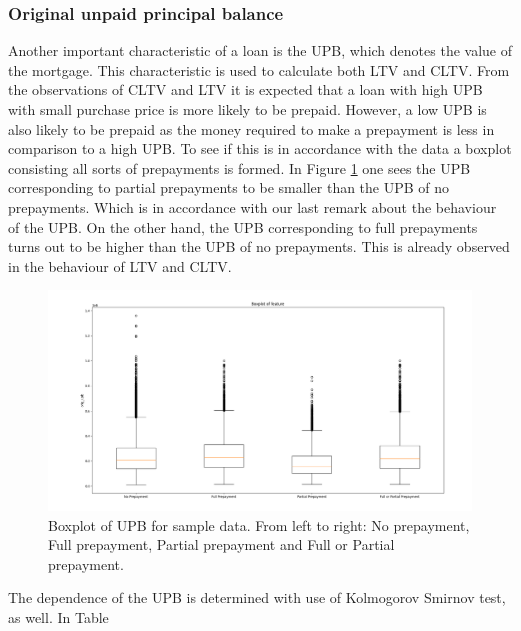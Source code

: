     \subsubsection{Original unpaid principal balance}
        Another important characteristic of a loan is the UPB, 
        which denotes the value of the mortgage. This characteristic 
        is used to calculate both LTV and CLTV. From the 
        observations of CLTV and LTV it is expected that a loan 
        with high UPB with small purchase price is more likely 
        to be prepaid. However, a low UPB is also likely to be 
        prepaid as the money required to make a prepayment is 
        less in comparison to a high UPB. To see if this is in 
        accordance with the data a boxplot consisting all 
        sorts of prepayments is formed. In Figure 
        \ref{model_boxplot_UPB} one sees the UPB corresponding 
        to partial prepayments to be smaller than the UPB of no 
        prepayments. Which is in accordance with our last remark 
        about the behaviour of the UPB. On the other hand, the 
        UPB corresponding to full prepayments turns out to be 
        higher than the UPB of no prepayments. This is already 
        observed in the behaviour of LTV and CLTV. 
        \begin{figure}[H]
            \centering
            \includegraphics[width=\linewidth]{Figures/Boxplot_of_upb_[2013, 2014, 2015, 2016, 2017, 2018, 2019, 2020]_.png}
            \caption{
                Boxplot of UPB for sample data. From left to right: 
                No prepayment, Full prepayment, Partial prepayment 
                and Full or Partial prepayment.
                }
            \label{model_boxplot_UPB}
        \end{figure}
        \noindent
        The dependence of the UPB is determined with use of 
        Kolmogorov Smirnov test, as well. In Table 

